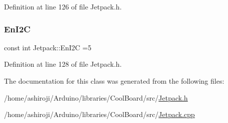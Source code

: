 Definition at line 126 of file Jetpack.\+h.

\mbox{\label{class_jetpack_a81df984fb4cea98c71aa1a1cfcdfe814}} 
\subsubsection{\texorpdfstring{En\+I2C}{EnI2C}}
{\footnotesize\ttfamily const int Jetpack\+::\+En\+I2C =5\hspace{0.3cm}{\ttfamily [private]}}



Definition at line 128 of file Jetpack.\+h.



The documentation for this class was generated from the following files\+:\begin{DoxyCompactItemize}
\item 
/home/ashiroji/\+Arduino/libraries/\+Cool\+Board/src/\hyperlink{_jetpack_8h}{Jetpack.\+h}\item 
/home/ashiroji/\+Arduino/libraries/\+Cool\+Board/src/\hyperlink{_jetpack_8cpp}{Jetpack.\+cpp}\end{DoxyCompactItemize}
